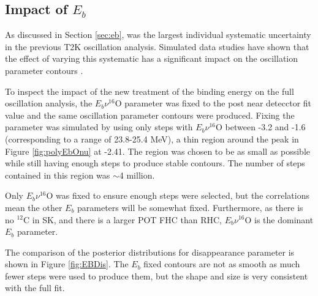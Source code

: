 \subsection{Impact of $E_{b}$}\label{secc:jointeb}

As discussed in Section \ref{sec:eb}, was the largest individual systematic uncertainty in the previous T2K oscillation analysis. Simulated data studies have shown that the effect of varying this systematic has a significant impact on the oscillation parameter contours \cite{tn331}.

To inspect the impact of the new treatment of the binding energy on the full oscillation analysis, the $E_b \nu ^{16}$O parameter was fixed to the post near detecctor fit value and the same oscillation parameter contours were produced. Fixing the parameter was simulated by using only steps with $E_b \nu ^{16}$O between -3.2 and -1.6 (corresponding to a range of 23.8-25.4 MeV), a thin region around the peak in Figure \ref{fig:polyEbOnu} at -2.41. The region was chosen to be as small as possible while still having enough steps to produce stable contours. The number of steps contained in this region was $\sim$4 million.

Only $E_b \nu ^{16}$O was fixed to ensure enough steps were selected, but the correlations mean the other $E_{b}$ parameters will be somewhat fixed. Furthermore, as there is no $^{12}$C in SK, and there is a larger POT FHC than RHC, $E_b \nu ^{16}$O is the dominant $E_b$ parameter.

The comparison of the posterior distributions for disappearance parameter is shown in Figure \ref{fig:EBDis}. The $E_b$ fixed contours are not as smooth as much fewer steps were used to produce them, but the shape and size is very consistent with the full fit. 

